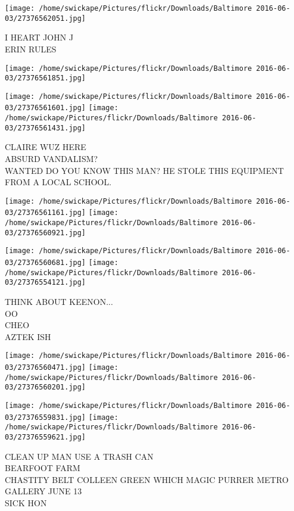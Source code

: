 \documentclass[10pt,letterpaper]{article}
\begin{document}
\vspace{0.25in}
\texttt{[image: /home/swickape/Pictures/flickr/Downloads/Baltimore 2016-06-03/27376562051.jpg]}

I HEART JOHN J\\
ERIN RULES\\
\pagebreak

\texttt{[image: /home/swickape/Pictures/flickr/Downloads/Baltimore 2016-06-03/27376561851.jpg]}

\vspace{0.25in}
\texttt{[image: /home/swickape/Pictures/flickr/Downloads/Baltimore 2016-06-03/27376561601.jpg]}
\texttt{[image: /home/swickape/Pictures/flickr/Downloads/Baltimore 2016-06-03/27376561431.jpg]}

CLAIRE WUZ HERE\\
ABSURD VANDALISM?\\
WANTED DO YOU KNOW THIS MAN?  HE STOLE THIS EQUIPMENT FROM A LOCAL SCHOOL.\\
\pagebreak

\texttt{[image: /home/swickape/Pictures/flickr/Downloads/Baltimore 2016-06-03/27376561161.jpg]}
\texttt{[image: /home/swickape/Pictures/flickr/Downloads/Baltimore 2016-06-03/27376560921.jpg]}

\texttt{[image: /home/swickape/Pictures/flickr/Downloads/Baltimore 2016-06-03/27376560681.jpg]}
\texttt{[image: /home/swickape/Pictures/flickr/Downloads/Baltimore 2016-06-03/27376554121.jpg]}

THINK ABOUT KEENON...\\
OO\\
CHEO\\
AZTEK ISH\\
\pagebreak

\texttt{[image: /home/swickape/Pictures/flickr/Downloads/Baltimore 2016-06-03/27376560471.jpg]}
\texttt{[image: /home/swickape/Pictures/flickr/Downloads/Baltimore 2016-06-03/27376560201.jpg]}

\texttt{[image: /home/swickape/Pictures/flickr/Downloads/Baltimore 2016-06-03/27376559831.jpg]}
\texttt{[image: /home/swickape/Pictures/flickr/Downloads/Baltimore 2016-06-03/27376559621.jpg]}

CLEAN UP MAN USE A TRASH CAN\\
BEARFOOT FARM\\
CHASTITY BELT COLLEEN GREEN WHICH MAGIC PURRER METRO GALLERY JUNE 13\\
SICK HON\\
\pagebreak
\end{document}
